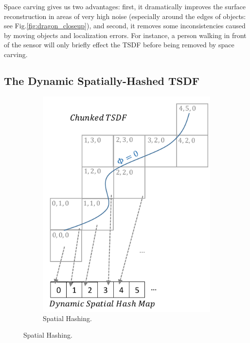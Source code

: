 \documentclass[conference]{IEEEtran}
\newcommand{\figref}[1]{Fig.\ref{#1}}
\newcommand{\TSDF}{TSDF\xspace}
\begin{document}
Space carving gives us two advantages: first, it dramatically improves the
surface reconstruction in areas of very high noise (especially around the edges
of objects: see \figref{fig:dragon_closeup}), and second, it removes
some inconsistencies caused by moving objects and localization errors. For
instance, a person walking in front of the sensor will only briefly effect the
\TSDF before being removed by space carving.
 
\subsection{The Dynamic Spatially-Hashed \TSDF}
\label{section:spatialhash}

\begin{figure}[t!]
 	  	\begin{subfigure}[b]{0.45\linewidth} \centering
 	    \includegraphics[width=1.0\textwidth]{img/chunks.pdf}
 	      \caption{Spatial Hashing.}
 	  	\label{fig:chunks} 
 	  \end{subfigure} 

\end{figure}
\end{document}
